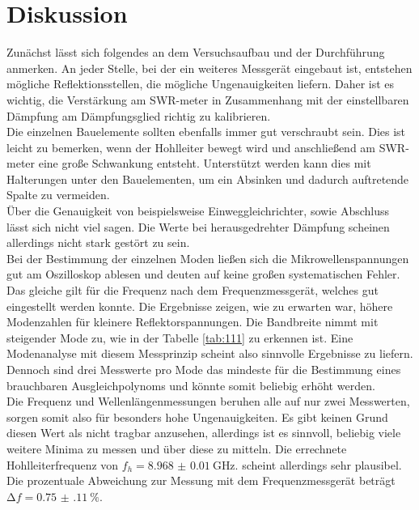 \section{Diskussion}

Zunächst lässt sich folgendes an dem Versuchsaufbau und der Durchführung anmerken. An jeder Stelle, bei der ein weiteres Messgerät
eingebaut ist, entstehen mögliche Reflektionsstellen, die mögliche Ungenauigkeiten liefern. Daher ist es 
wichtig, die Verstärkung am SWR-meter in Zusammenhang mit der einstellbaren Dämpfung am 
Dämpfungsglied richtig zu kalibrieren. 
\\
Die einzelnen Bauelemente sollten ebenfalls immer gut verschraubt sein. Dies ist leicht zu bemerken, wenn der Hohlleiter bewegt wird und 
anschließend am SWR-meter eine große Schwankung entsteht. Unterstützt werden kann dies mit Halterungen unter den Bauelementen, um ein Absinken und dadurch auftretende
Spalte zu vermeiden.
\\
Über die Genauigkeit von beispielsweise Einweggleichrichter, sowie Abschluss lässt sich nicht viel sagen. Die Werte bei
herausgedrehter Dämpfung scheinen allerdings nicht stark gestört zu sein.
\\
\newline
Bei der Bestimmung der einzelnen Moden ließen sich die Mikrowellenspannungen gut am Oszilloskop ablesen und deuten auf 
keine großen systematischen Fehler. Das gleiche gilt für die Frequenz nach dem Frequenzmessgerät, welches gut eingestellt werden konnte.
Die Ergebnisse zeigen, wie zu erwarten war, höhere Modenzahlen für kleinere Reflektorspannungen. Die Bandbreite nimmt mit steigender Mode zu, wie in 
der Tabelle \ref{tab:111} zu erkennen ist. Eine Modenanalyse mit diesem Messprinzip scheint also sinnvolle Ergebnisse zu liefern. Dennoch sind drei Messwerte
pro Mode das mindeste für die Bestimmung eines brauchbaren Ausgleichpolynoms und könnte somit beliebig erhöht werden.
\\
\newline
Die Frequenz und Wellenlängenmessungen beruhen alle auf nur zwei Messwerten, sorgen somit also für besonders hohe Ungenauigkeiten. Es gibt keinen Grund diesen
Wert als nicht tragbar anzusehen, allerdings ist es sinnvoll, beliebig viele weitere Minima zu messen und über diese zu mitteln. Die errechnete Hohlleiterfrequenz
von $f_h = \SI{8.968(10)}{\giga\hertz}.$ scheint allerdings sehr plausibel. Die prozentuale Abweichung zur Messung mit dem Frequenzmessgerät beträgt $\increment f = \SI{0.75(11)}{\percent}$.
\\
